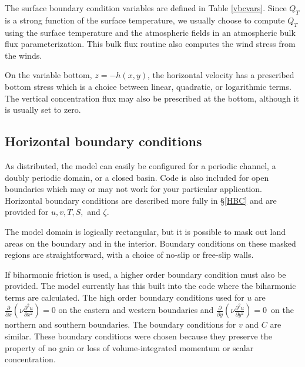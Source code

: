 The surface boundary condition variables are defined in Table
\ref{vbcvars}.  Since $Q_T$ is a strong function of the surface
temperature, we usually choose to compute $Q_T$ using the surface
temperature and the atmospheric fields in an atmospheric bulk flux
parameterization. This bulk flux routine also computes the wind
stress from the winds.

On the variable bottom,
$z = -h(x,y)$, the horizontal velocity has
a prescribed bottom stress which is a choice between linear,
quadratic, or logarithmic terms.
The vertical concentration flux may also be prescribed at the bottom,
although it is usually set to zero.

\subsection{Horizontal boundary conditions}
As distributed, the model can easily be configured for a periodic
channel, a doubly periodic domain, or a closed basin.  Code is also
included for open boundaries which may or may not work for your
particular application. Horizontal boundary conditions are
described more fully in \S\ref{HBC} and are
provided for $u,v,T,S,$ and $\zeta$.

The model domain is logically rectangular, but it is possible to
mask out land areas on the boundary and in the interior. Boundary
conditions on these masked regions are straightforward,
with a choice of no-slip or free-slip walls.

If biharmonic friction is used, a higher order boundary condition
must also be provided.  The model currently has this built into the
code where the biharmonic terms are calculated.  The high order
boundary conditions used for $u$ are $\frac{\partial}{\partial x} \left(
{\nu} \frac{\partial ^2 u}{\partial x^2} \right) = 0$ on the
eastern and western boundaries and $\frac{\partial}{\partial y} \left(
{\nu} \frac{\partial ^2 u}{\partial y^2} \right) = 0\,$ on the
northern and southern boundaries.  The boundary conditions for $v$
and $C$ are similar.  These boundary conditions were chosen because
they preserve the property of no gain or loss of volume-integrated
momentum or scalar concentration.

